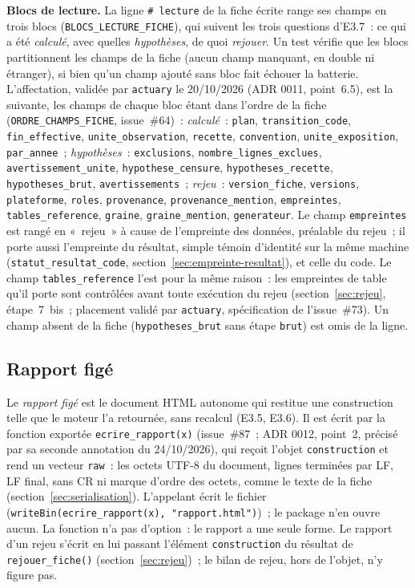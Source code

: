 \documentclass[a4paper,11pt]{article}
\newcommand{\code}[1]{\texttt{\small #1}}
\begin{document}
\medskip
{\sloppy
\textbf{Blocs de lecture.} La ligne \code{\# lecture} de la fiche écrite
range ses champs en trois blocs (\code{BLOCS\_LECTURE\_FICHE}), qui suivent
les trois questions d'E3.7~: ce qui a été \emph{calculé}, avec quelles
\emph{hypothèses}, de quoi \emph{rejouer}. Un test vérifie que les blocs
partitionnent les champs de la fiche (aucun champ manquant, en double ni
étranger), si bien qu'un champ ajouté sans bloc fait échouer la batterie.
L'affectation, validée par \code{actuary} le 20/10/2026 (ADR 0011,
point~6.5), est la suivante, les champs de chaque bloc étant dans l'ordre
de la fiche (\code{ORDRE\_CHAMPS\_FICHE}, issue~\#64)~:
\emph{calculé}~: \code{plan}, \code{transition\_code},
\code{fin\_effective}, \code{unite\_observation}, \code{recette},
\code{convention}, \code{unite\_exposition}, \code{par\_annee}~;
\emph{hypothèses}~: \code{exclusions}, \code{nombre\_lignes\_exclues},
\code{avertissement\_unite}, \code{hypothese\_censure},
\code{hypotheses\_recette}, \code{hypotheses\_brut},
\code{avertissements}~; \emph{rejeu}~:
\code{version\_fiche}, \code{versions}, \code{plateforme}, \code{roles},
\code{provenance}, \code{provenance\_mention}, \code{empreintes},
\code{tables\_reference}, \code{graine}, \code{graine\_mention},
\code{generateur}. Le champ
\code{empreintes} est rangé en «~rejeu~» à cause de l'empreinte des données,
préalable du rejeu~; il porte aussi l'empreinte du résultat, simple témoin
d'identité sur la même machine (\code{statut\_resultat\_code},
section~\ref{sec:empreinte-resultat}), et celle du code. Le champ
\code{tables\_reference} l'est pour la même raison~: les empreintes de
table qu'il porte sont contrôlées avant toute exécution du rejeu
(section~\ref{sec:rejeu}, étape~7~bis~; placement validé par
\code{actuary}, spécification de l'issue~\#73). Un champ absent de la fiche (\code{hypotheses\_brut}
sans étape \code{brut}) est omis de la ligne.\par}

\subsection{Rapport figé}
\label{sec:rapport-fige}
\begingroup\sloppy

Le \emph{rapport figé} est le document HTML autonome qui restitue une
construction telle que le moteur l'a retournée, sans recalcul (E3.5,
E3.6). Il est écrit par la fonction exportée \code{ecrire\_rapport(x)}
(issue~\#87~; ADR 0012, point~2, précisé par sa seconde annotation du
24/10/2026), qui reçoit l'objet \code{construction} et rend un vecteur
\code{raw}~: les octets UTF-8 du document, lignes terminées par LF, LF
final, sans CR ni marque d'ordre des octets, comme le texte de la fiche
(section~\ref{sec:serialisation}). L'appelant écrit le fichier
(\code{writeBin(ecrire\_rapport(x), "rapport.html")})~; le package n'en
ouvre aucun. La fonction n'a pas d'option~: le rapport a une seule forme.
Le rapport d'un rejeu s'écrit en lui passant l'élément \code{construction}
du résultat de \code{rejouer\_fiche()} (section~\ref{sec:rejeu})~; le bilan
de rejeu, hors de l'objet, n'y figure pas.
\end{document}
